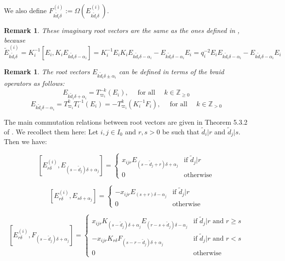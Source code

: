\documentclass[12pt]{amsart}
\newtheorem{rem}[thm]{Remark}
\numberwithin{equation}{section}
\newcommand{\Z}{\ensuremath{\mathbb{Z}}}
\begin{document}
We also define $F_{k\tilde{d}_i\delta}^{(i)}:=\Omega(E_{k\tilde{d}_i\delta}^{(i)})$.

\begin{rem}
    These imaginary root vectors are the same as the ones defined in \cite{D}, because $\tilde{E}_{k\tilde{d}_i\delta}^{(i)} = K_i^{-1}[E_i, K_iE_{k\tilde{d}_i\delta - \alpha_i}] = K_i^{-1}E_iK_iE_{k\tilde{d}_i\delta - \alpha_i} - E_{k\tilde{d}_i\delta - \alpha_i}E_i = q_i^{-2}E_iE_{k\tilde{d}_i\delta - \alpha_i} - E_{k\tilde{d}_i\delta - \alpha_i}E_i$
\end{rem}

\begin{rem}
    The root vectors $E_{k\tilde{d}_i\delta \pm \alpha_i}$ can be defined in terms of the braid operators as follows: 
    $$ E_{k\tilde{d}_i\delta + \alpha_i} = T^{-k}_{\varpi_i}(E_i), \quad \mbox{ for all } \quad k \in \Z_{\geq 0} $$
    $$ E_{k\tilde{d}_i\delta - \alpha_i} = T^{k}_{\varpi_i}T^{-1}_{i}(E_i) = -T^{k}_{\varpi_i}(K_i^{-1}F_i), \quad \mbox{ for all } \quad k\in \Z_{> 0} $$
\end{rem}

The main commutation relations between root vectors are given in Theorem 5.3.2 of \cite{D}. We recollect them here: Let $i,j \in I_0$ and $r,s > 0$ be such that $\tilde{d}_i|r$ and $\tilde{d}_j|s$. Then we have: 

\begin{equation}\label{for2.1}
    [E_{r\delta}^{(i)}, E_{(s-\tilde{d}_j)\delta + \alpha_j}] = \begin{cases}
        x_{ijr}E_{(s-\tilde{d}_j + r)\delta+\alpha_j} & \mbox{if } \tilde{d}_j|r \\
        0 & \mbox{otherwise}
    \end{cases}
\end{equation}

\begin{equation}\label{for2.2}
    [E_{r\delta}^{(i)}, E_{s\delta + \alpha_j}] = \begin{cases}
        -x_{ijr}E_{(s + r)\delta-\alpha_j} & \mbox{if } \tilde{d}_j|r \\
        0 & \mbox{otherwise}
    \end{cases}
\end{equation}

\begin{equation}\label{commfor}
    [E_{r\delta}^{(i)}, F_{(s-\tilde{d}_j)\delta + \alpha_j}] = \begin{cases}
        x_{ijr}K_{(s-\tilde{d}_j)\delta + \alpha_j}E_{(r - s + \tilde{d}_j)\delta-\alpha_j} & \mbox{if } \tilde{d}_j|r \mbox{ and } r\geq s \\
        -x_{ijr}K_{r\delta}F_{(s-r-\tilde{d}_j)\delta + \alpha_j} & \mbox{if } \tilde{d}_j|r \mbox{ and } r < s\\
        0 & \mbox{otherwise}
    \end{cases}
\end{equation}
\end{document}
